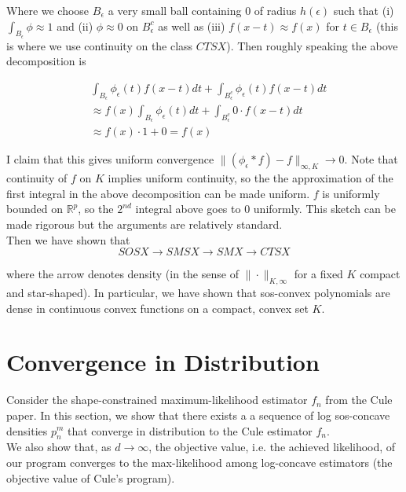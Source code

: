 \documentclass[11pt,reqno]{amsart}
\theoremstyle{definition}
\numberwithin{equation}{section}
\newcommand{\eps}{\epsilon}
\newcommand{\mr}{\mathbb{R}}
\begin{document}
Where we choose $B_{\eps}$ a very small ball containing $0$ of radius $h(\eps)$ such that (i) $\int_{B_{\eps}} \phi \approx 1$ and (ii) $\phi \approx 0 $ on $B_{\eps}^c$ as well as (iii) $f(x-t) \approx f(x)$ for $t \in B_{\eps}$ (this is where we use continuity on the class $CTSX$). Then roughly speaking the above decomposition is 

\begin{align*}
&\int_{B_{\eps}} \phi_{\eps}(t) f(x - t) dt + \int_{B_{\eps}^c} \phi_{\eps}(t) f(x - t) dt\\
&\approx f(x) \int_{B_{\eps}} \phi_{\eps}(t) dt + \int_{B_{\eps}^c} 0 \cdot f(x -t) dt \\
&\approx f(x) \cdot 1 + 0 = f(x)
\end{align*}

I claim that this gives uniform convergence $\|(\phi_{\eps} \ast f) - f\|_{\infty, K} \to 0$. Note that continuity of $f$ on $K$ implies uniform continuity, so the the approximation of the first integral in the above decomposition can be made uniform. $f$ is uniformly bounded on $\mr^p$, so the $2^{nd}$ integral above goes to $0$ uniformly. This sketch can be made rigorous but the arguments are relatively standard. \\

Then we have shown that \\

\[
SOSX \longrightarrow SMSX \longrightarrow SMX \longrightarrow CTSX
\]

where the arrow denotes density (in the sense of $\| \cdot \|_{K,\infty}$ for a fixed $K$ compact and star-shaped). In particular, we have shown that sos-convex polynomials are dense in continuous convex functions on a compact, convex set $K$. \\

\section{Convergence in Distribution}

Consider the shape-constrained maximum-likelihood estimator $f_n$ from the Cule paper. In this section, we show that there exists a a sequence of log sos-concave densities $p_n^m$ that converge in distribution to the Cule estimator $f_n$. \\

We also show that, as $d \to \infty$, the objective value, i.e. the achieved likelihood, of our program converges to the max-likelihood among log-concave estimators (the objective value of Cule's program). \\
\end{document}
